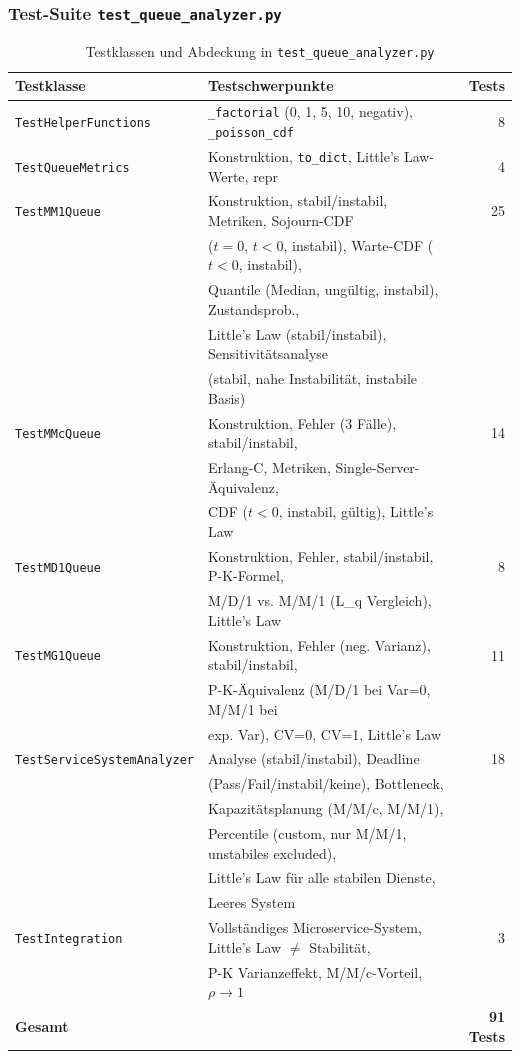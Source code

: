 ﻿\documentclass[a4paper,12pt]{scrreprt}
\theoremstyle{definition}
\begin{document}
\subsubsection{Test-Suite \texttt{test\_queue\_analyzer.py}}

\begin{table}
	\centering
	\begin{tabular}{@{}llr@{}}
		\toprule
		\textbf{Testklasse} & \textbf{Testschwerpunkte} & \textbf{Tests} \\
		\midrule
		\texttt{TestHelperFunctions} & \texttt{\_factorial} (0, 1, 5, 10, negativ),
		\texttt{\_poisson\_cdf} & 8 \\
		\texttt{TestQueueMetrics} & Konstruktion, \texttt{to\_dict},
		Little's Law-Werte, repr & 4 \\
		\texttt{TestMM1Queue} & Konstruktion, stabil/instabil, Metriken,
		Sojourn-CDF & 25 \\
		& ($t=0$, $t<0$, instabil), Warte-CDF ($t<0$, instabil), & \\
		& Quantile (Median, ungültig, instabil), Zustandsprob., & \\
		& Little's Law (stabil/instabil), Sensitivitätsanalyse & \\
		& (stabil, nahe Instabilität, instabile Basis) & \\
		\texttt{TestMMcQueue} & Konstruktion, Fehler (3 Fälle), stabil/instabil, & 14 \\
		& Erlang-C, Metriken, Single-Server-Äquivalenz, & \\
		& CDF ($t<0$, instabil, gültig), Little's Law & \\
		\texttt{TestMD1Queue} & Konstruktion, Fehler, stabil/instabil, P-K-Formel, & 8 \\
		& M/D/1 vs. M/M/1 (L\_q Vergleich), Little's Law & \\
		\texttt{TestMG1Queue} & Konstruktion, Fehler (neg. Varianz), stabil/instabil, & 11 \\
		& P-K-Äquivalenz (M/D/1 bei Var=0, M/M/1 bei & \\
		& exp. Var), CV=0, CV=1, Little's Law & \\
		\texttt{TestServiceSystemAnalyzer} & Analyse (stabil/instabil), Deadline & 18 \\
		& (Pass/Fail/instabil/keine), Bottleneck, & \\
		& Kapazitätsplanung (M/M/c, M/M/1), & \\
		& Percentile (custom, nur M/M/1, unstabiles excluded), & \\
		& Little's Law für alle stabilen Dienste, & \\
		& Leeres System & \\
		\texttt{TestIntegration} & Vollständiges Microservice-System,
		Little's Law $\neq$ Stabilität, & 3 \\
		& P-K Varianzeffekt, M/M/c-Vorteil, $\rho \to 1$ & \\
		\midrule
		\textbf{Gesamt} & & \textbf{91 Tests} \\
		\bottomrule
	\end{tabular}
	\caption{Testklassen und Abdeckung in \texttt{test\_queue\_analyzer.py}}
	\label{tab:tests-queue}
\end{table}
\end{document}

